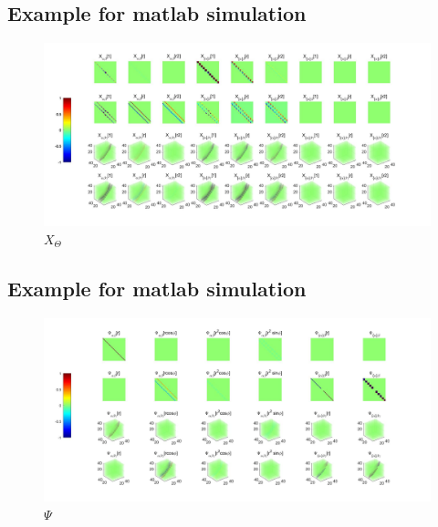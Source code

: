 \documentclass{Note}
\begin{document}
  
  \subsection{Example for matlab simulation}
\begin{figure}
  \centerline{\includegraphics[width=8in]{XFun.jpg}}
  \caption{$X_ \Theta$}
  \end{figure}


  
  \subsection{Example for matlab simulation}
\begin{figure}
  \centerline{\includegraphics[width=8in]{PsiFun.jpg}}
  \caption{$\Psi$}
  \end{figure}
\end{document}
